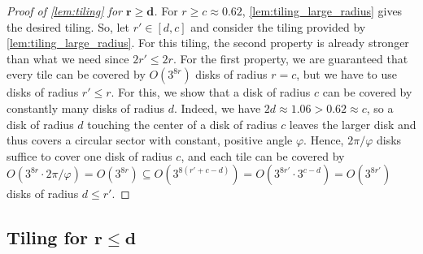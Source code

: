 \documentclass[a4paper,english,cleveref,thm-restate]{lipics-v2021}
\renewcommand{\phi}{\varphi}
\begin{document}
\begin{proof}%
[Proof of \cref{lem:tiling} for $ \bm{r \geq d} $]
%
    For $ r \geq c \approx 0.62 $, \cref{lem:tiling_large_radius} gives the desired tiling.
    So, let $ r' \in [d, c] $ and consider the tiling provided by 
    \cref{lem:tiling_large_radius}.
    For this tiling, the second property is already stronger than what we need since $ 2r' \leq 2r $.
    For the first property, we are guaranteed that every tile can be covered by $ O(3^{8r}) $ disks of radius $ r = c $, but we have to use disks of radius $ r' \leq r $.
    For this, we show that a disk of radius $ c $ can be covered by constantly many disks of radius $ d $.
    Indeed, we have $ 2d \approx 1.06 > 0.62 \approx c $, so a disk of radius $ d $ touching the center of a disk of radius $ c $ leaves the larger disk and thus covers a circular sector with constant, positive angle $ \phi $.
    Hence, $ 2 \pi / \phi $ disks suffice to cover one disk of radius $ c $, and each tile can be covered by 
    $ O(3^{8r} \cdot 2 \pi / \phi) 
        = O(3^{8r}) 
        \subseteq O(3^{8(r' + c - d)}) 
        = O(3^{8 r'} \cdot 3^{c - d}) 
        = O(3^{8r'}) $ 
    disks of radius $ d \leq r' $.
\end{proof}


\subsection{Tiling for \texorpdfstring{$ \bm{r \leq d} $}{r < d}}
\label{sec:tiling_small_radius}
\end{document}
